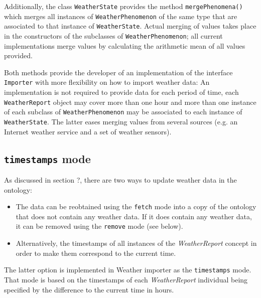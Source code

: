 Additionally, the class \texttt{WeatherState} provides the method \texttt{mergePhenomena()} which merges all instances of \texttt{WeatherPhenomenon} of the same type that are associated to that instance of \texttt{WeatherState}. Actual merging of values takes place in the constructors of the subclasses of \texttt{WeatherPhenomenon}; all current implementations merge values by calculating the arithmetic mean of all values provided.

Both methods provide the developer of an implementation of the interface \texttt{Importer} with more flexibility on how to import weather data: An implementation is not required to provide data for each period of time, each \texttt{WeatherReport} object may cover more than one hour and more than one instance of each subclass of \texttt{WeatherPhenomenon} may be associated to each instance of \texttt{WeatherState}. The latter eases merging values from several sources (e.g. an Internet weather service and a set of weather sensors).

\subsection{\texttt{timestamps} mode}

As discussed in section ?, there are two ways to update weather data in the \thinkhomeweather ontology:
\begin{itemize}
  \item The data can be reobtained using the \texttt{fetch} mode into a copy of the ontology that does not contain any weather data. If it does contain any weather data, it can be removed using the \texttt{remove} mode (see below).
  \item Alternatively, the timestamps of all instances of the \emph{WeatherReport} concept in order to make them correspond to the current time.
\end{itemize}

The latter option is implemented in Weather importer as the \texttt{timestamps} mode. That mode is based on the timestamps of each \emph{WeatherReport} individual being specified by the difference to the current time in hours.

